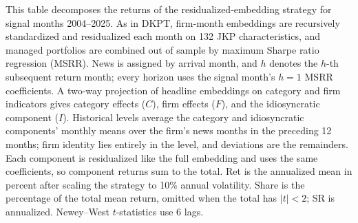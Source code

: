 \begin{table}[htbp]
\centering
\caption{Decomposition of the Residualized-Embedding Strategy}
\label{tab:tab8}
\begin{minipage}{\linewidth}\footnotesize
This table decomposes the returns of the residualized-embedding strategy for signal months 2004--2025. As in DKPT, firm-month embeddings are recursively standardized and residualized each month on 132 JKP characteristics, and managed portfolios are combined out of sample by maximum Sharpe ratio regression (MSRR). News is assigned by arrival month, and $h$ denotes the $h$-th subsequent return month; every horizon uses the signal month's $h=1$ MSRR coefficients. A two-way projection of headline embeddings on category and firm indicators gives category effects ($C$), firm effects ($F$), and the idiosyncratic component ($I$). Historical levels average the category and idiosyncratic components' monthly means over the firm's news months in the preceding 12 months; firm identity lies entirely in the level, and deviations are the remainders. Each component is residualized like the full embedding and uses the same coefficients, so component returns sum to the total. Ret is the annualized mean in percent after scaling the strategy to 10\% annual volatility. Share is the percentage of the total mean return, omitted when the total has $|t|<2$; SR is annualized. Newey--West $t$-statistics use 6 lags.
\end{minipage}
\medskip


\end{table}
